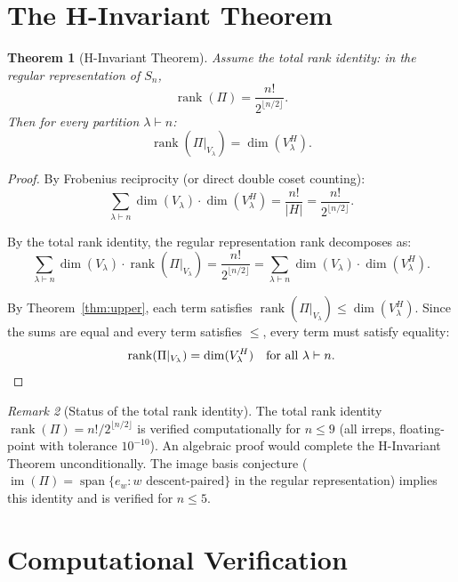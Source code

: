 \documentclass[11pt]{article}
\newtheorem{theorem}{Theorem}
\theoremstyle{definition}
\theoremstyle{remark}
\newtheorem{remark}[theorem]{Remark}
\newcommand{\rank}{\operatorname{rank}}
\newcommand{\im}{\operatorname{im}}
\begin{document}
\section{The H-Invariant Theorem}

\begin{theorem}[H-Invariant Theorem]\label{thm:main}
Assume the total rank identity: in the regular representation of $S_n$,
\[
\rank(\Pi) = \frac{n!}{2^{\lfloor n/2 \rfloor}}.
\]
Then for every partition $\lambda \vdash n$:
\[
\rank(\Pi|_{V_\lambda}) = \dim(V_\lambda^H).
\]
\end{theorem}

\begin{proof}
By Frobenius reciprocity (or direct double coset counting):
\[
\sum_{\lambda \vdash n} \dim(V_\lambda) \cdot \dim(V_\lambda^H)
= \frac{n!}{|H|}
= \frac{n!}{2^{\lfloor n/2 \rfloor}}.
\]

By the total rank identity, the regular representation rank decomposes as:
\[
\sum_{\lambda \vdash n} \dim(V_\lambda) \cdot \rank(\Pi|_{V_\lambda})
= \frac{n!}{2^{\lfloor n/2 \rfloor}}
= \sum_{\lambda \vdash n} \dim(V_\lambda) \cdot \dim(V_\lambda^H).
\]

By Theorem~\ref{thm:upper}, each term satisfies
$\rank(\Pi|_{V_\lambda}) \leq \dim(V_\lambda^H)$.
Since the sums are equal and every term satisfies $\leq$, every
term must satisfy equality:
\[
\rank(\Pi|_{V_\lambda}) = \dim(V_\lambda^H)
\quad \text{for all } \lambda \vdash n. \qedhere
\]
\end{proof}

\begin{remark}[Status of the total rank identity]
The total rank identity $\rank(\Pi) = n!/2^{\lfloor n/2 \rfloor}$
is verified computationally for $n \leq 9$ (all irreps, floating-point
with tolerance $10^{-10}$). An algebraic proof would complete the
H-Invariant Theorem unconditionally. The image basis conjecture
($\im(\Pi) = \operatorname{span}\{e_w : w \text{ descent-paired}\}$
in the regular representation) implies this identity and is verified
for $n \leq 5$.
\end{remark}

\section{Computational Verification}
\end{document}
